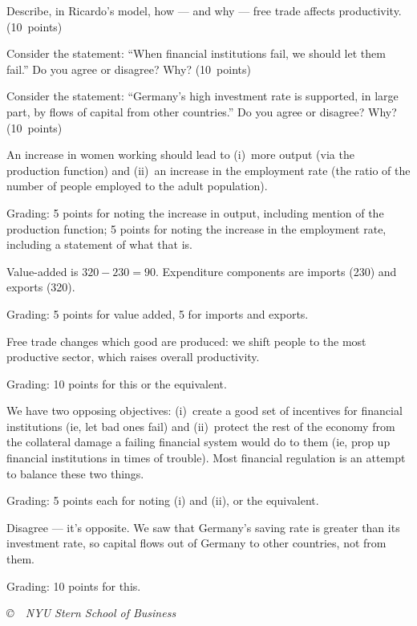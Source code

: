 \documentclass[letterpaper,12pt]{exam}
\begin{document}
\begin{questions}
\begin{parts}
\item Describe, in Ricardo's model, how --- and why ---
free trade affects productivity.
(10~points)

\item Consider the statement:
``When financial institutions fail, we should let them fail.''
Do you agree or disagree?  Why?
(10~points)

\item Consider the statement:  ``Germany's high investment rate
is supported, in large part, by flows of capital from other countries.''
Do you agree or disagree?  Why?
(10~points)
\end{parts}

\begin{solution}
\begin{parts}
\item An increase in women working should lead to
(i)~more output (via the production function)
and (ii)~an increase in the employment rate
(the ratio of the number of people employed to the adult population).

Grading:  5 points for noting the increase in output, including mention
of the production function;
5 points for noting the increase in the employment rate,
including a statement of what that is.

\item Value-added is $ 320 - 230 = 90$.
Expenditure components are imports (230) and exports (320).

Grading:  5 points for value added, 5 for imports and exports.

\item Free trade changes which good are produced:
we shift people to the most productive sector, which raises overall productivity.

Grading:  10 points for this or the equivalent.

\item We have two opposing objectives:
(i)~create a good set of incentives for financial institutions
(ie, let bad ones fail)
and (ii)~protect the rest of the economy from the collateral damage a
failing financial system would do to them
(ie, prop up financial institutions in times of trouble).
Most financial regulation is an attempt to balance these two things.

Grading:  5 points each for noting (i) and (ii),
or the equivalent.

\item Disagree --- it's opposite.
We saw that Germany's saving rate is greater than its investment rate,
so capital flows out of Germany to other countries, not from them.

Grading:  10 points for this.

\end{parts}
%
\end{solution}

\end{questions}


\vfill \centerline{\it \copyright \ \number\year \ NYU Stern
School of Business}
\end{document}
